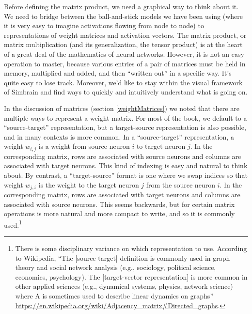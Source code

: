 Before defining the matrix product, we need a graphical way to think about it. We need to bridge between the ball-and-stick models we have been using (where it is very easy to imagine activations flowing from node to node) to representations of weight matrices and activation vectors. The matrix product, or matrix multiplication (and its generalization, the tensor product) is at the heart of a great deal of the mathematics of neural networks. However, it is not an easy operation to master, because various entries of a pair of matrices must be held in memory, multiplied and added, and then ``written out'' in a specific way. It's quite easy to lose track. Moreover, we'd like to stay within the visual framework of Simbrain and find ways to quickly and intuitively understand what is going on. 

In the discussion of matrices (section \ref{weightMatrices}) we noted that there are multiple ways to represent a weight matrix. For most of the book, we default to a ``source-target'' representation, but a target-source representation is also possible, and in many contexts is more common. In a ``source-target'' representation, a weight $w_{i, j}$ is a weight from source neuron $i$ to target neuron $j$. In the corresponding matrix, rows are associated with source neurons and columns are associated with target neurons. This kind of indexing is easy and natural to think about. By contrast, a ``target-source'' format is one where we swap indices so that weight $w_{j, i}$ is the weight to the target neuron $j$ from the source neuron $i$. In the corresponding matrix, rows are associated with target neurons and columns are associated with source neurons. This seems backwards, but for certain matrix operations is more natural and more compact to write, and so it is commonly used.\footnote{There is some disciplinary variance on which representation to use. According to Wikipedia, ``The [source-target] definition is commonly used in graph theory and social network analysis (e.g., sociology, political science, economics, psychology). The [target-vector representation] is more common in other applied sciences (e.g., dynamical systems, physics, network science) where A is sometimes used to describe linear dynamics on graphs'' \url{https://en.wikipedia.org/wiki/Adjacency_matrix\#Directed_graphs}.}

